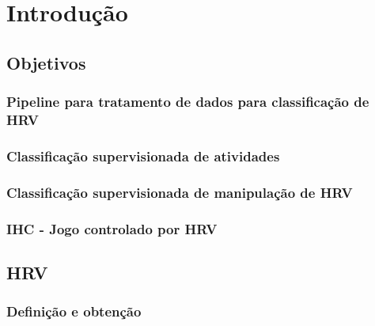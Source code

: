 \chapter{Introdução} 
\label{intro}




    \section{Objetivos}
    \label{goals}
    
        \subsection{Pipeline para tratamento de dados para classificação de HRV}
        
        \subsection{Classificação supervisionada de atividades}
       
        \subsection{Classificação supervisionada de manipulação de HRV}
        
        \subsection{IHC - Jogo controlado por HRV}



    \section{HRV}
    \label{HRV}
        
        \subsection {Definição e obtenção}
        
       
